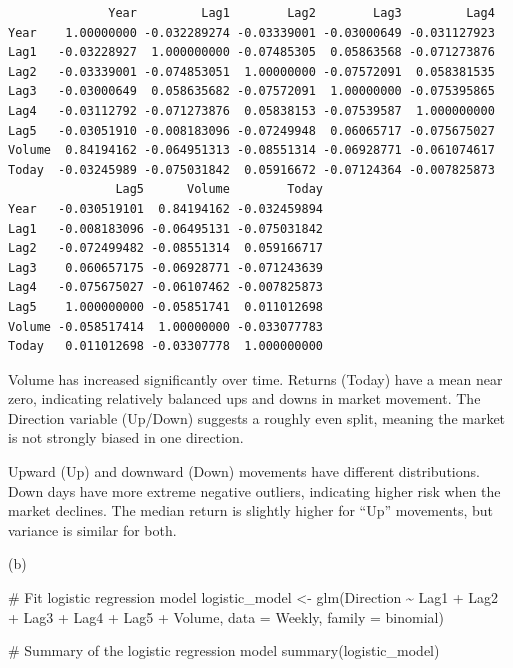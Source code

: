 \documentclass[
]{article}
\newenvironment{Shaded}{\begin{snugshade}}{\end{snugshade}}
\newcommand{\AttributeTok}[1]{\textcolor[rgb]{0.40,0.45,0.13}{#1}}
\newcommand{\CommentTok}[1]{\textcolor[rgb]{0.37,0.37,0.37}{#1}}
\newcommand{\FunctionTok}[1]{\textcolor[rgb]{0.28,0.35,0.67}{#1}}
\newcommand{\NormalTok}[1]{\textcolor[rgb]{0.00,0.23,0.31}{#1}}
\newcommand{\OtherTok}[1]{\textcolor[rgb]{0.00,0.23,0.31}{#1}}
\newcommand{\SpecialCharTok}[1]{\textcolor[rgb]{0.37,0.37,0.37}{#1}}
\begin{document}
\begin{verbatim}
              Year         Lag1        Lag2        Lag3         Lag4
Year    1.00000000 -0.032289274 -0.03339001 -0.03000649 -0.031127923
Lag1   -0.03228927  1.000000000 -0.07485305  0.05863568 -0.071273876
Lag2   -0.03339001 -0.074853051  1.00000000 -0.07572091  0.058381535
Lag3   -0.03000649  0.058635682 -0.07572091  1.00000000 -0.075395865
Lag4   -0.03112792 -0.071273876  0.05838153 -0.07539587  1.000000000
Lag5   -0.03051910 -0.008183096 -0.07249948  0.06065717 -0.075675027
Volume  0.84194162 -0.064951313 -0.08551314 -0.06928771 -0.061074617
Today  -0.03245989 -0.075031842  0.05916672 -0.07124364 -0.007825873
               Lag5      Volume        Today
Year   -0.030519101  0.84194162 -0.032459894
Lag1   -0.008183096 -0.06495131 -0.075031842
Lag2   -0.072499482 -0.08551314  0.059166717
Lag3    0.060657175 -0.06928771 -0.071243639
Lag4   -0.075675027 -0.06107462 -0.007825873
Lag5    1.000000000 -0.05851741  0.011012698
Volume -0.058517414  1.00000000 -0.033077783
Today   0.011012698 -0.03307778  1.000000000
\end{verbatim}

Volume has increased significantly over time. Returns (Today) have a
mean near zero, indicating relatively balanced ups and downs in market
movement. The Direction variable (Up/Down) suggests a roughly even
split, meaning the market is not strongly biased in one direction.

Upward (Up) and downward (Down) movements have different distributions.
Down days have more extreme negative outliers, indicating higher risk
when the market declines. The median return is slightly higher for
``Up'' movements, but variance is similar for both.

(b)

\begin{Shaded}
\begin{Highlighting}[]
\CommentTok{\# Fit logistic regression model}
\NormalTok{logistic\_model }\OtherTok{\textless{}{-}} \FunctionTok{glm}\NormalTok{(Direction }\SpecialCharTok{\textasciitilde{}}\NormalTok{ Lag1 }\SpecialCharTok{+}\NormalTok{ Lag2 }\SpecialCharTok{+}\NormalTok{ Lag3 }\SpecialCharTok{+}\NormalTok{ Lag4 }\SpecialCharTok{+}\NormalTok{ Lag5 }\SpecialCharTok{+}\NormalTok{ Volume, }
                      \AttributeTok{data =}\NormalTok{ Weekly, }\AttributeTok{family =}\NormalTok{ binomial)}

\CommentTok{\# Summary of the logistic regression model}
\FunctionTok{summary}\NormalTok{(logistic\_model)}
\end{Highlighting}
\end{Shaded}
\end{document}
